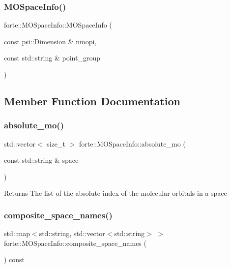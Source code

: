 \subsubsection{\texorpdfstring{M\+O\+Space\+Info()}{MOSpaceInfo()}}
{\footnotesize\ttfamily forte\+::\+M\+O\+Space\+Info\+::\+M\+O\+Space\+Info (\begin{DoxyParamCaption}\item[{const psi\+::\+Dimension \&}]{nmopi,  }\item[{const std\+::string \&}]{point\+\_\+group }\end{DoxyParamCaption})}



\subsection{Member Function Documentation}
\mbox{\label{classforte_1_1_m_o_space_info_a4328ee82ef7ca2237b5f1b1055f18f41}} 
\subsubsection{\texorpdfstring{absolute\+\_\+mo()}{absolute\_mo()}}
{\footnotesize\ttfamily std\+::vector$<$ size\+\_\+t $>$ forte\+::\+M\+O\+Space\+Info\+::absolute\+\_\+mo (\begin{DoxyParamCaption}\item[{const std\+::string \&}]{space }\end{DoxyParamCaption})}

\begin{DoxyReturn}{Returns}
The list of the absolute index of the molecular orbitals in a space 
\end{DoxyReturn}
\mbox{\label{classforte_1_1_m_o_space_info_ae95e8a5714111df520ec4b89058f9956}} 
\subsubsection{\texorpdfstring{composite\+\_\+space\+\_\+names()}{composite\_space\_names()}}
{\footnotesize\ttfamily std\+::map$<$std\+::string, std\+::vector$<$std\+::string$>$ $>$ forte\+::\+M\+O\+Space\+Info\+::composite\+\_\+space\+\_\+names (\begin{DoxyParamCaption}{ }\end{DoxyParamCaption}) const\hspace{0.3cm}{\ttfamily [inline]}}

